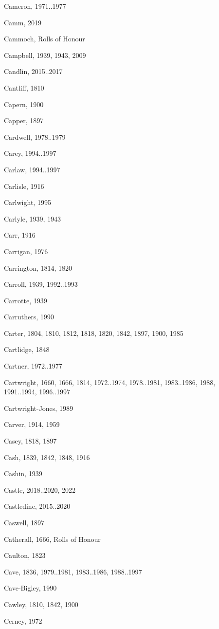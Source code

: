 \begin{theindex}
\item Cameron, 1971..1977
\item Camm, 2019
\item Cammoch, Rolls of Honour
\item Campbell, 1939, 1943, 2009
\item Candlin, 2015..2017
\item Cantliff, 1810
\item Capern, 1900
\item Capper, 1897
\item Cardwell, 1978..1979
\item Carey, 1994..1997
\item Carlaw, 1994..1997
\item Carlisle, 1916
\item Carlwight, 1995
\item Carlyle, 1939, 1943
\item Carr, 1916
\item Carrigan, 1976
\item Carrington, 1814, 1820
\item Carroll, 1939, 1992..1993
\item Carrotte, 1939
\item Carruthers, 1990
\item Carter, 1804, 1810, 1812, 1818, 1820, 1842, 1897, 1900, 1985
\item Cartlidge, 1848
\item Cartner, 1972..1977
\item Cartwright, 1660, 1666, 1814, 1972..1974, 1978..1981, 1983..1986, 1988, 1991..1994, 1996..1997
\item Cartwright-Jones, 1989
\item Carver, 1914, 1959
\item Casey, 1818, 1897
\item Cash, 1839, 1842, 1848, 1916
\item Cashin, 1939
\item Castle, 2018..2020, 2022
\item Castledine, 2015..2020
\item Caswell, 1897
\item Catherall, 1666, Rolls of Honour
\item Caulton, 1823
\item Cave, 1836, 1979..1981, 1983..1986, 1988..1997
\item Cave-Bigley, 1990
\item Cawley, 1810, 1842, 1900
\item Cerney, 1972

\end{theindex}
